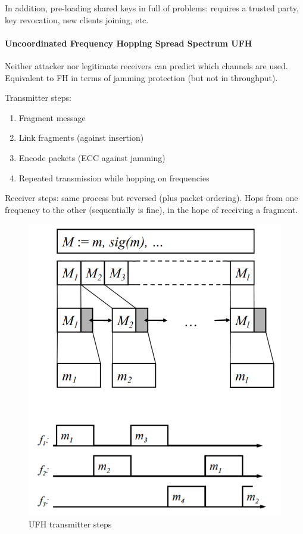 In addition, pre-loading shared keys in full of problems:
requires a trusted party, key revocation, new clients joining, etc.

\paragraph{Uncoordinated Frequency Hopping Spread Spectrum UFH}
Neither attacker nor legitimate receivers can predict which channels are used.
Equivalent to FH in terms of jamming protection (but not in throughput).

Transmitter steps:
\begin{enumerate}
	\item Fragment message
	\item Link fragments (against insertion)
	\item Encode packets (ECC against jamming)
	\item Repeated transmission while hopping on frequencies
\end{enumerate}

Receiver steps: same process but reversed (plus packet ordering).
Hops from one frequency to the other (sequentially is fine), in the hope of receiving a fragment.

\begin{figure}
	\centering
	\includegraphics[scale=0.4]{images/3-ufh.png}
	\caption{UFH transmitter steps}
	\label{fig:ufh}
\end{figure}

